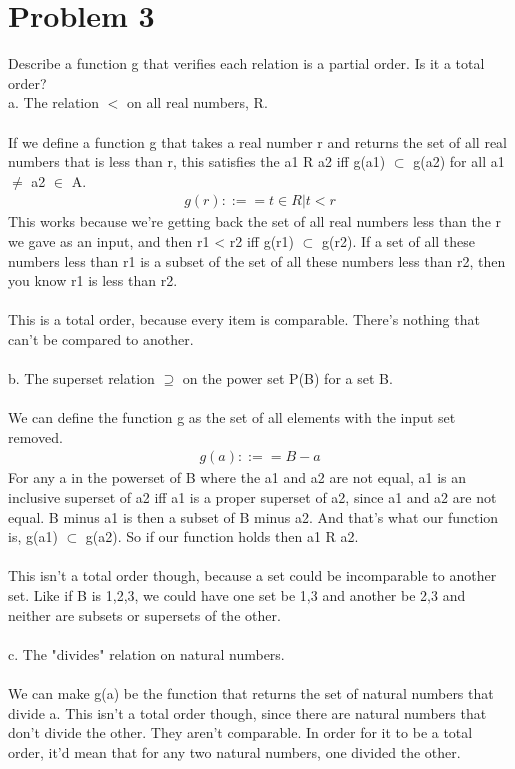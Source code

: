 \documentclass{article}
\begin{document}
\section{Problem 3}
Describe a function g that verifies each relation is a partial order. Is it a total order?
\\
a. The relation $<$ on all real numbers, R.
\\\\
If we define a function g that takes a real number r and returns the set of all real numbers that is less than r, this satisfies the a1 R a2 iff g(a1) $\subset$ g(a2) for all a1 $\neq$ a2 $\in$ A.
\begin {align*}
g(r) ::== {t \in R | t < r}
\end {align*}
This works because we're getting back the set of all real numbers less than the r we gave as an input, and then r1 < r2 iff g(r1) $\subset$ g(r2). If a set of all these numbers less than r1 is a subset of the set of all these numbers less than r2, then you know r1 is less than r2. 
\\\\
This is a total order, because every item is comparable. There's nothing that can't be compared to another.
\\\\
b. The superset relation $\supseteq$ on the power set P(B) for a set B. 
\\\\
We can define the function g as the set of all elements with the input set removed. 
\begin {align*}
g(a) ::== B - {a}
\end {align*}
For any a in the powerset of B where the a1 and a2 are not equal, a1 is an inclusive superset of a2 iff a1 is a proper superset of a2, since a1 and a2 are not equal. B minus a1 is then a subset of B minus a2. And that's what our function is, g(a1) $\subset$ g(a2). So if our function holds then a1 R a2. 
\\\\
This isn't a total order though, because a set could be incomparable to another set. Like if B is {1,2,3}, we could have one set be {1,3} and another be {2,3} and neither are subsets or supersets of the other. 
\\\\
c. The "divides" relation on natural numbers.
\\\\
We can make g(a) be the function that returns the set of natural numbers that divide a. This isn't a total order though, since there are natural numbers that don't divide the other. They aren't comparable. In order for it to be a total order, it'd mean that for any two natural numbers, one divided the other. 
\\\\
\end{document}
